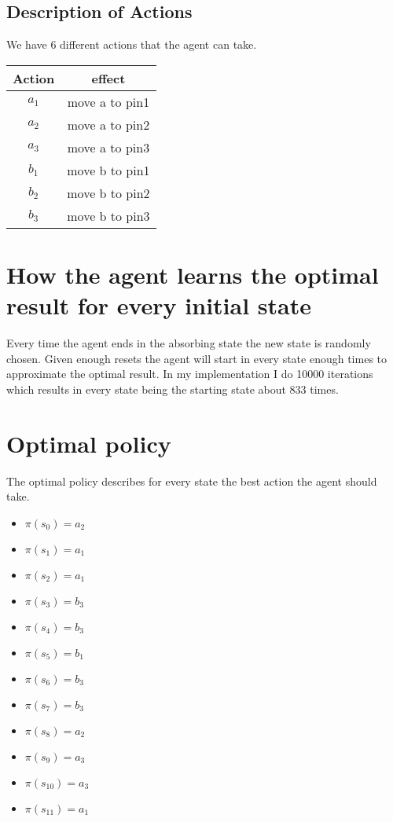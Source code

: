 \documentclass[a4paper]{article}
\begin{document}
\newpage
\subsection{Description of Actions}
We have 6 different actions that the agent can take. \\

\begin{tabular}{c|c}
Action & effect \\
\hline
$a_{1}$ & move a to pin1 \\
$a_{2}$ & move a to pin2 \\
$a_{3}$ & move a to pin3 \\
$b_{1}$ & move b to pin1 \\
$b_{2}$ & move b to pin2 \\
$b_{3}$ & move b to pin3
\end{tabular}

\section{How the agent learns the optimal result for every initial state}
Every time the agent ends in the absorbing state the new state is randomly chosen. Given enough resets the agent will start in every state enough times to approximate the optimal result. In my implementation I do 10000 iterations which results in every state being the starting state about 833 times.

\section{Optimal policy}
The optimal policy describes for every state the best action the agent should take.

\begin{multicols}{2}
\begin{itemize}
\item $\pi(s_{0}) = a_{2}$
\item $\pi(s_{1}) = a_{1}$
\item $\pi(s_{2}) = a_{1}$
\item $\pi(s_{3}) = b_{3}$
\item $\pi(s_{4}) = b_{3}$
\item $\pi(s_{5}) = b_{1}$
\item $\pi(s_{6}) = b_{3}$
\item $\pi(s_{7}) = b_{3}$
\item $\pi(s_{8}) = a_{2}$
\item $\pi(s_{9}) = a_{3}$
\item $\pi(s_{10}) = a_{3}$
\item $\pi(s_{11}) = a_{1}$
\end{itemize}
\end{multicols}
\end{document}
